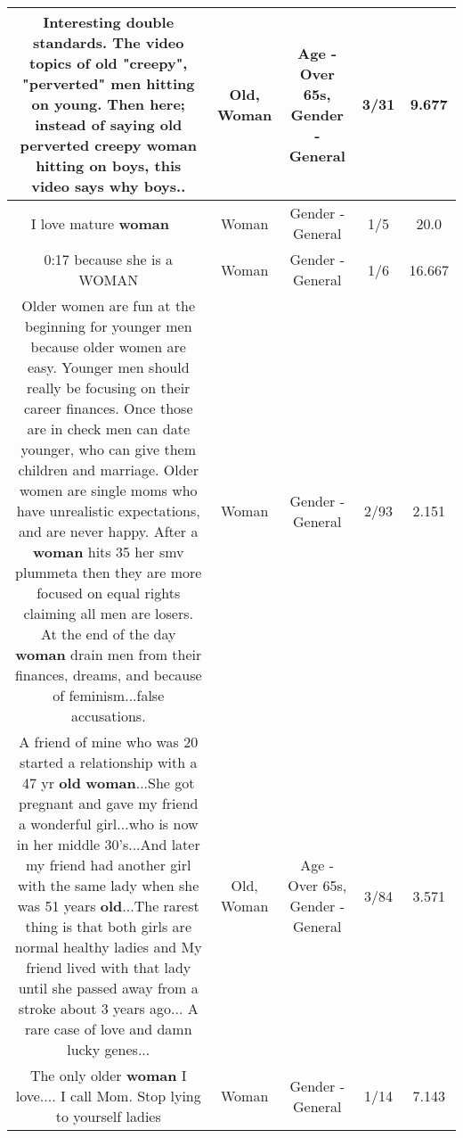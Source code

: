 \documentclass[11pt]{article}
\newlength\mylength
\begin{document}
\begin{center}
\begin{longtable}{|C{.65\mylength}|C{.30\mylength}|C{.12\mylength}|C{.12\mylength}|C{.12\mylength}|}
  \small Interesting double standards. The video topics of \textbf{old} "creepy", "perverted" men hitting on young. Then here; instead of saying \textbf{old} perverted creepy \textbf{woman} hitting on boys, this video says why boys..\normalsize   & Old, Woman & Age - Over 65s, Gender - General & 3/31 & 9.677 \\  \hline
  \small I love mature \textbf{woman} 💞💞💞\normalsize   & Woman & Gender - General & 1/5 & 20.0 \\  \hline
  \small 0:17 because she is a WOMAN\normalsize   & Woman & Gender - General & 1/6 & 16.667 \\  \hline
  \small Older women are fun at the beginning for younger men because older women are easy.  Younger men should really be focusing on their career finances.  Once those are in check men can date younger, who can give them children and marriage.   Older women are single moms who have unrealistic expectations, and are never happy.   After a \textbf{woman} hits 35 her smv plummeta then they are more focused on equal rights claiming all men are losers.  At the end of the day \textbf{woman} drain men from their finances,  dreams,  and because of feminism...false accusations.\normalsize   & Woman & Gender - General & 2/93 & 2.151 \\  \hline
  \small A friend of mine who was 20 started a relationship with a 47 yr \textbf{old} \textbf{woman}...She got pregnant and gave my friend a wonderful girl...who is now in her middle 30's...And later my friend had another girl with the same lady when she was 51 years \textbf{old}...The rarest thing is that both girls are normal healthy ladies and My friend  lived with that lady until she passed away from a stroke about 3 years ago... A rare case of love and damn lucky genes...\normalsize   & Old, Woman & Age - Over 65s, Gender - General & 3/84 & 3.571 \\  \hline
  \small The only older \textbf{woman} I love.... I call Mom. Stop lying to yourself ladies\normalsize   & Woman & Gender - General & 1/14 & 7.143 \\  \hline

\end{longtable}
\end{center}
\end{document}
